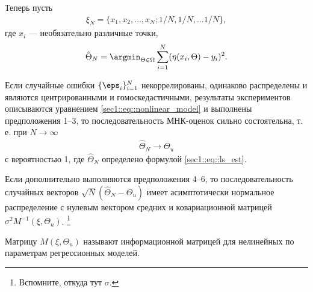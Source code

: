 Теперь пусть 
\begin{gather*}
    \xi_N = \{x_1, x_2, \ldots, x_N; 1/N, 1/N, \ldots 1/N\},
\end{gather*}
где $x_i$ --- необязательно различные точки,
\begin{gather}
    \label{sec1::eq::ls_est}
    \hat \Theta_N = \argmin_{\Theta \in \Omega} \sum_{i = 1}^N (\eta(x_i, \Theta) - y_i)^2.
\end{gather}

\begin{thm}
    Если случайные ошибки $\{\eps_i\}_{i=1}^N$ некоррелированы, одинаково распределены и являются центрированными и гомоскедастичными, результаты
    экспериментов описываются уравнением \eqref{sec1::eq::nonlinear_model} и выполнены предположения 1--3,
    то последовательность МНК-оценок сильно состоятельна,
    т. е. при $N \to \infty$
    \begin{gather*}
        \hat \Theta_N \to \Theta_u
    \end{gather*}
    с вероятностью 1, где $\hat \Theta_N$ определено формулой \eqref{sec1::eq::ls_est}.

    Если дополнительно выполняются предположения 4--6, то последовательность случайных векторов $\sqrt N (\hat \Theta_N - \Theta_u)$
    имеет асимптотически нормальное распределение с нулевым вектором средних и ковариационной матрицей $\sigma^2 M^{-1}(\xi, \Theta_u)$.
    \footnote{Вспомните, откуда тут $\sigma$.}
\end{thm}

Матрицу $M(\xi, \Theta_u)$ называют информационной матрицей для нелинейных по параметрам регрессионных моделей.
